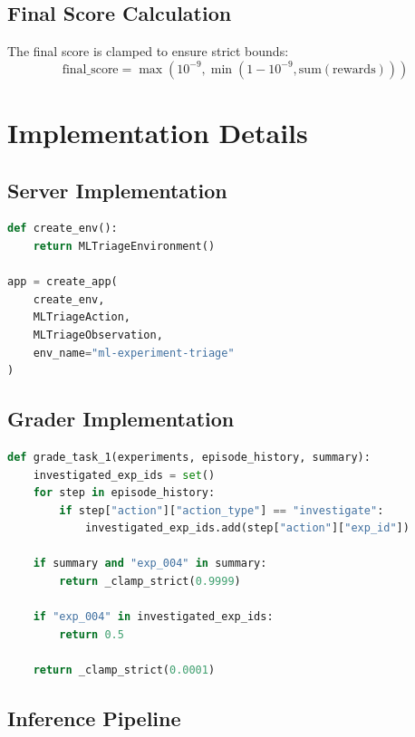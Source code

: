 \documentclass[12pt,a4paper]{article}
\begin{document}
\subsection{Final Score Calculation}

The final score is clamped to ensure strict bounds:
\begin{equation}
	\text{final\_score} = \max(10^{-9}, \min(1 - 10^{-9}, \text{sum}(\text{rewards})))
\end{equation}

\section{Implementation Details}

\subsection{Server Implementation}

\begin{lstlisting}[language=Python, caption={Environment Factory}]
def create_env():
    return MLTriageEnvironment()

app = create_app(
    create_env,
    MLTriageAction,
    MLTriageObservation,
    env_name="ml-experiment-triage"
)
\end{lstlisting}

\subsection{Grader Implementation}

\begin{lstlisting}[language=Python, caption={Task Grading Function}]
def grade_task_1(experiments, episode_history, summary):
    investigated_exp_ids = set()
    for step in episode_history:
        if step["action"]["action_type"] == "investigate":
            investigated_exp_ids.add(step["action"]["exp_id"])
    
    if summary and "exp_004" in summary:
        return _clamp_strict(0.9999)
    
    if "exp_004" in investigated_exp_ids:
        return 0.5
    
    return _clamp_strict(0.0001)
\end{lstlisting}

\subsection{Inference Pipeline}
\end{document}
